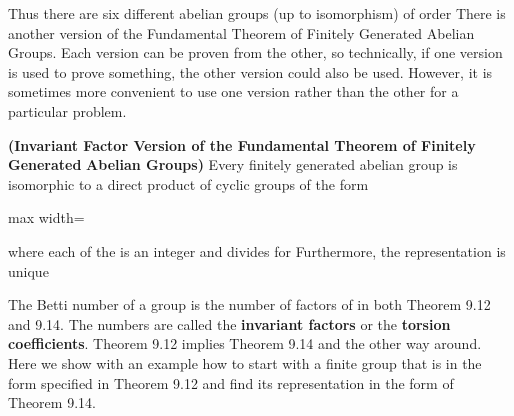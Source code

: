 \documentclass[11pt,oneside]{article}
\begin{document}
\begin{BookBody}




Thus there are six different abelian groups (up to isomorphism) of order  There is another version of the Fundamental Theorem of Finitely Generated Abelian Groups. Each version can be proven from the other, so technically, if one version is used to prove something, the other version could also be used. However, it is sometimes more convenient to use one version rather than the other for a particular problem.

 \textbf{(Invariant Factor Version of the Fundamental Theorem of Finitely Generated} \textbf{Abelian Groups)} Every finitely generated abelian group is isomorphic to a direct product of cyclic groups of the form

\begin{center}\begin{adjustbox}{max width=\linewidth}\end{adjustbox}\end{center}

\noindent where each of the  is an integer and  divides  for  Furthermore, the representation is unique\BookEnd{\blacklozenge}

The Betti number of a group is the number of factors of  in both Theorem 9.12 and 9.14. The numbers  are called the\textbf{ invariant factors} or the\textbf{ torsion coefficients}. Theorem 9.12 implies Theorem 9.14 and the other way around. Here we show with an example how to start with a finite group that is in the form specified in Theorem 9.12 and find its representation in the form of Theorem 9.14.


\end{BookBody}
\end{document}

